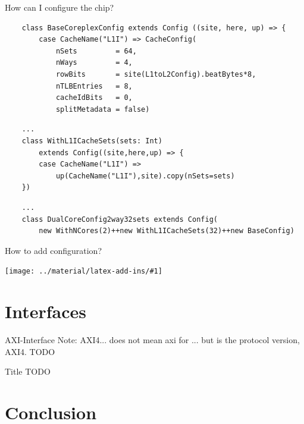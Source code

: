 \documentclass[]{beamer} %
\newcommand*{\COMPILEIMAGES}{}%
\newcommand\inputimage[1]{%
	\ifdefined\COMPILEIMAGES
		
	\else
		\texttt{[image: ../material/latex-add-ins/\#1]}
	\fi
	}
\newenvironment{fullpage}[0]{%
	\begin{list}{}{%
		\setlength{\leftmargin}{-10mm}%
		\setlength{\rightmargin}{-10mm}%
		\vspace*{-10pt}
		}%
\item[]}{\end{list}}
\begin{document}
\begin{frame}[fragile]{How can I configure the chip?}
	\begin{verbatim}
	class BaseCoreplexConfig extends Config ((site, here, up) => {
		case CacheName("L1I") => CacheConfig(
			nSets         = 64,
			nWays         = 4,
			rowBits       = site(L1toL2Config).beatBytes*8,
			nTLBEntries   = 8,
			cacheIdBits   = 0,
			splitMetadata = false)
	\end{verbatim}
	\pause
	\begin{verbatim}
	...
	class WithL1ICacheSets(sets: Int)
		extends Config((site,here,up) => {
		case CacheName("L1I") =>
			up(CacheName("L1I"),site).copy(nSets=sets)
	})
	\end{verbatim}
	\pause
	\begin{verbatim}
	...
	class DualCoreConfig2way32sets extends Config(
		new WithNCores(2)++new WithL1ICacheSets(32)++new BaseConfig)
	\end{verbatim}
\end{frame}


\begin{frame}{How to add configuration?}
	\begin{fullpage}
		\centering
		\inputimage{image1}
	\end{fullpage}
\end{frame}



\section{Interfaces}

\begin{frame}{AXI-Interface}
	Note: AXI4... does not mean axi for ... but is the protocol version, AXI4.
	TODO
\end{frame}

\begin{frame}{Title}
	TODO
\end{frame}



\section[Conclusion]{Conclusion}
\end{document}
